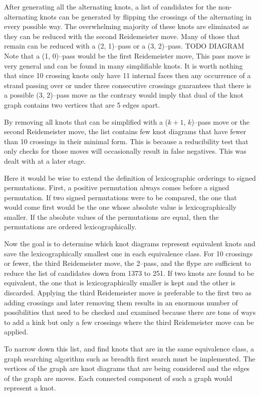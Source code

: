 \begin{paper}
After generating all the alternating knots, a list of candidates for the
non-alternating knots can be generated by flipping the crossings of the
alternating in every possible way.
The overwhelming majority of these knots are eliminated as they can be reduced
with the second Reidemeister move.
Many of those that remain can be reduced with a (2, 1)--pass or a (3, 2)--pass.
TODO DIAGRAM
Note that a (1, 0)--pass would be the first Reidemeister move,
This pass move is very general and can be found in many simplifiable knots.
It is worth nothing that since 10 crossing knots only have 11 internal faces
then any occurrence of a strand passing over or under three consecutive
crossings guarantees that there is a possible (3, 2)--pass move as the contrary
would imply that dual of the knot graph contains two vertices that are 5 edges
apart.

By removing all knots that can be simplified with a ($k+1$, $k$)--pass move or
the second Reidemeister move, the list contains few knot diagrams that have
fewer than 10 crossings in their minimal form.
This is because a reducibility test that only checks for those moves will
occasionally result in false negatives.
This was dealt with at a later stage.


Here it would be wise to extend the definition of lexicographic orderings to
signed permutations.
First, a positive permutation always comes before a signed permutation.
If two signed permutations were to be compared, the one that would come first
would be the one whose absolute value is lexicographically smaller.
If the absolute values of the permutations are equal, then the permutations are
ordered lexicographically.

Now the goal is to determine which knot diagrams represent equivalent knots and
save the lexicographically smallest one in each equivalence class.
For 10 crossings or fewer, the third Reidemeister move, the 2--pass, and the
flype are sufficient to reduce the list of candidates down from 1373 to 251.
If two knots are found to be equivalent, the one that is lexicographically
smaller is kept and the other is discarded.
Applying the third Reidemeister move is preferable to the first two as adding
crossings and later removing them results in an enormous number of possibilities
that need to be checked and examined because there are tons of ways to add a
kink but only a few crossings where the third Reidemeister move can be applied.

To narrow down this list, and find knots that are in the same equivalence class,
a graph searching algorithm such as breadth first search must be implemented.
The vertices of the graph are knot diagrams that are being considered and the
edges of the graph are moves.
Each connected component of such a graph would represent a knot.


\end{paper}
